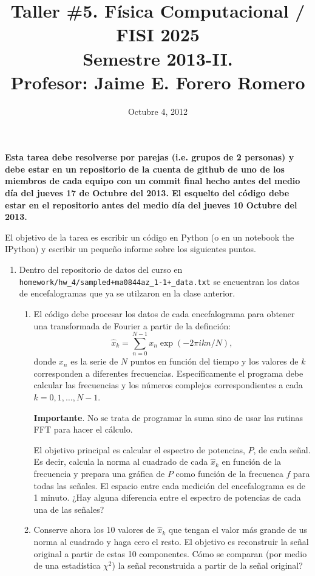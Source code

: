 \documentclass{article}
\title{Taller \#5. F\'isica Computacional / FISI 2025 \\Semestre
  2013-II. \\ Profesor: Jaime E. Forero Romero}
\date{Octubre 4, 2012}
\begin{document}
\maketitle

{\bf Esta tarea debe resolverse por parejas (i.e. grupos de 2
  personas) y debe estar en un repositorio de la cuenta de github de
  uno de los miembros de cada equipo con un commit final hecho antes del
  medio d\'ia del jueves 17 de Octubre del 2013. El esquelto del
  c\'odigo debe estar en el repositorio antes del medio d\'ia del
  jueves 10 Octubre  del 2013.}   

El objetivo de la tarea es escribir un c\'odigo en Python (o en un
notebook the IPython) y escribir un peque\~no informe sobre los
siguientes puntos.

\begin{enumerate}

\item
Dentro del repositorio de datos del curso en
\verb" homework/hw_4/sampled+ma0844az_1-1+_data.txt"  se encuentran
los datos de encefalogramas que ya se utilzaron en la clase anterior.

\begin{enumerate}

\item 
El c\'odigo debe procesar los datos de cada encefalograma  para obtener una
transformada de Fourier a partir de la definci\'on:
\begin{equation}
\hat{x}_{k} = \sum_{n=0}^{N-1}x_{n}\exp(-2\pi i k n/N), 
\end{equation}
donde $x_{n}$ es la serie de $N$ puntos en funci\'on del tiempo y los
valores de $k$ corresponden a diferentes
frecuencias. Espec\'ificamente el programa debe calcular las
frecuencias y los n\'umeros complejos correspondientes a cada
$k=0,1,\dots,N-1$. 

{\bf Importante}. No se trata de programar la suma sino de usar las
rutinas FFT para hacer el c\'alculo.


El objetivo principal es calcular el espectro de potencias, $P$, de
cada se\~nal. Es decir, calcula la norma al cuadrado de cada
$\hat{x}_{k}$ en funci\'on de la frecuencia y prepara una gr\'afica de
$P$  como funci\'on de la frecuenca $f$ para todas las se\~nales. El
espacio entre cada medici\'on del encefalograma es de 1 minuto. ¿Hay
alguna diferencia entre el espectro de potencias de cada una de las
se\~nales?  



\item 
Conserve ahora los 10 valores de $\hat{x}_{k}$ que tengan el valor
m\'as grande de us norma al cuadrado y haga cero el resto. El objetivo
es reconstruir la se\~nal original a partir de estas 10
componentes. C\'omo se comparan (por medio de una estad\'istica
$\chi^2$) la se\~nal reconstruida a partir de la se\~nal original?
\end{enumerate}



\end{enumerate}
\end{document}
